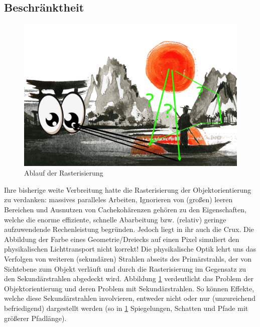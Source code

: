         \subsection{Beschränktheit}
        \label{sec:Rasterisierung:Beschränktheit}
        
        
        \begin{figure}[H]
            \centering
            \includegraphics[width=\linewidth]{content/PathTracer/Bilder/RasterizerGuide.png}
            \caption{Ablauf der Rasterisierung}
            \label{pic:RasterizerGuide}
        \end{figure}

        Ihre bisherige weite Verbreitung hatte die Rasterisierung der Objektorientierung zu verdanken: massives paralleles Arbeiten, Ignorieren von (großen) leeren Bereichen und
        Ausnutzen von Cachekohärenzen gehören zu den Eigenschaften, welche die enorme effiziente, schnelle Abarbeitung bzw. (relativ) geringe aufzuwendende Rechenleistung begründen.
        Jedoch liegt in ihr auch die Crux.
        Die Abbildung der Farbe eines Geometrie/Dreiecks auf einen Pixel simuliert
        den physikalischen Lichttransport nicht korrekt! Die physikalische Optik lehrt uns das Verfolgen von weiteren (sekundären) Strahlen abseits des Primärstrahls, der von 
        Sichtebene zum Objekt verläuft und durch die Rasterisierung im Gegensatz zu den Sekundärstrahlen abgedeckt wird. Abbildung \ref{pic:RasterizerGuide} verdeutlicht das 
        Problem der Objektorientierung und deren Problem mit Sekundärstrahlen. So können Effekte, welche diese Sekundärstrahlen involvieren, 
        entweder nicht oder nur (unzureichend befriedigend) dargestellt werden (so in \ref{pic:RasterizerGuide} Spiegelungen, Schatten und Pfade mit größerer Pfadlänge). \par

